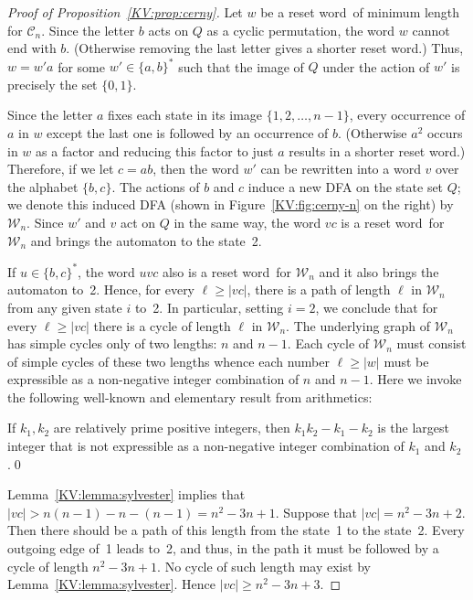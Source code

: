 \documentclass{irmaart}
\newcommand{\sw}{reset word}
\theoremstyle{plain}
\begin{document}
\begin{proof}[Proof of Proposition~\ref{KV:prop:cerny}]
Let $w$ be a \sw\ of minimum length for $\mathcal{C}_n$. Since the letter $b$
acts on $Q$ as a cyclic permutation, the word $w$ cannot end with $b$.
(Otherwise removing the last letter gives a shorter \sw.) Thus, $w = w'a$ for
some $w'\in\{a,b\}^*$ such that the image of $Q$ under the action of $w'$ is
precisely the set $\{0,1\}$.

Since the letter $a$ fixes each state in its image $\{1,2,\dots,n-1\}$, every
occurrence of $a$ in $w$ except the last one is followed by an occurrence of
$b$. (Otherwise $a^2$ occurs in $w$ as a factor and reducing this factor to
just $a$ results in a shorter \sw.) Therefore, if we let $c=ab$, then the word
$w'$ can be rewritten into a word $v$ over the alphabet $\{b,c\}$. The actions
of $b$ and $c$ induce a new DFA on the state set $Q$; we denote this induced
DFA (shown in Figure~\ref{KV:fig:cerny-n} on the right) by $\mathcal{W}_n$.
Since $w'$ and $v$ act on $Q$ in the same way, the word $vc$ is a \sw\ for
$\mathcal{W}_n$ and brings the automaton to the state~2.

If $u\in\{b,c\}^*$, the word $uvc$ also is a \sw\ for $\mathcal{W}_n$ and it
also brings the automaton to~2. Hence, for every $\ell\ge|vc|$, there is a path
of length $\ell$ in $\mathcal{W}_n$ from any given state $i$ to~2. In
particular, setting $i=2$, we conclude that for every $\ell\ge|vc|$ there is a
cycle of length $\ell$ in $\mathcal{W}_n$. The underlying graph of
$\mathcal{W}_n$ has simple cycles only of two lengths: $n$ and $n-1$. Each
cycle of $\mathcal{W}_n$ must consist of simple cycles of these two lengths
whence each number $\ell\ge|w|$ must be expressible as a non-negative integer
combination of $n$ and $n-1$. Here we invoke the following well-known and
elementary result from arithmetics:

\begin{lemma}
\label{KV:lemma:sylvester} If $k_1,k_2$ are relatively prime positive integers,
then $k_1k_2-k_1-k_2$ is the largest integer that is not expressible as a
non-negative integer combination of $k_1$ and $k_2$.\qed
\end{lemma}

Lemma~\ref{KV:lemma:sylvester} implies that
$|vc|>n(n-1)-n-(n-1)=n^2-3n+1$. Suppose that $|vc|=n^2-3n+2$. Then
there should be a path of this length from the state~1 to the
state~2. Every outgoing edge of~1 leads to~2, and thus, in the
path it must be followed by a cycle of length $n^2-3n+1$. No cycle
of such length may exist by Lemma~\ref{KV:lemma:sylvester}. Hence
$|vc|\ge n^2-3n+3$.


\end{proof}
\end{document}
